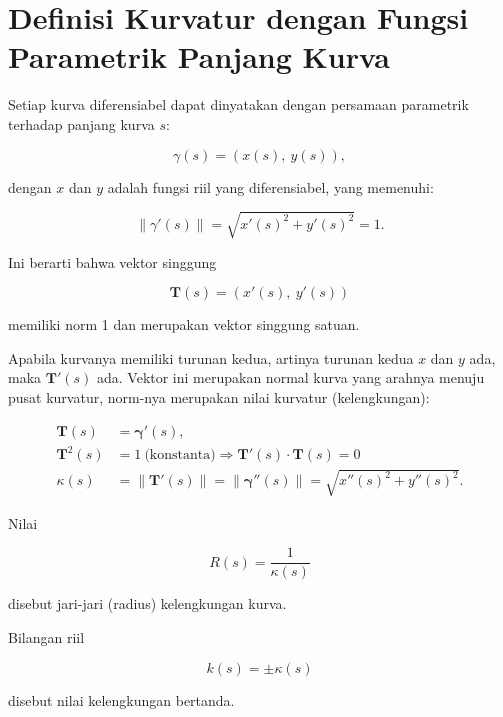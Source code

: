 \documentclass[a4paper,11pt,oneside,enabledeprecatedfontcommands]{scrbook}
\newenvironment{eulernotebook}{}{}
\newcommand{\eulersubheading}[1]{\section{#1}}
\newenvironment{eulercomment}{\par\medskip\noindent}{\par\medskip}
\newenvironment{eulerformula}{}{}
\begin{document}
\begin{eulernotebook}
\eulersubheading{Definisi Kurvatur dengan Fungsi Parametrik Panjang Kurva}
\begin{eulercomment}
Setiap kurva diferensiabel dapat dinyatakan dengan persamaan parametrik terhadap panjang kurva $s$:
\end{eulercomment}
\begin{eulerformula}
\[
\gamma(s) = (x(s),\ y(s)),
\]
\end{eulerformula}
\begin{eulercomment}
dengan $x$ dan $y$ adalah fungsi riil yang diferensiabel, yang memenuhi:
\end{eulercomment}
\begin{eulerformula}
\[
\|\gamma'(s)\|=\sqrt{x'(s)^2+y'(s)^2}=1.
\]
\end{eulerformula}
\begin{eulercomment}
Ini berarti bahwa vektor singgung
\end{eulercomment}
\begin{eulerformula}
\[
\mathbf{T}(s)=(x'(s),\ y'(s))
\]
\end{eulerformula}
\begin{eulercomment}
memiliki norm 1 dan merupakan vektor singgung satuan.

Apabila kurvanya memiliki turunan kedua, artinya turunan kedua $x$ dan $y$ ada, maka $\mathbf{T}'(s)$ ada. Vektor ini merupakan normal kurva yang arahnya menuju pusat kurvatur, norm-nya merupakan nilai kurvatur (kelengkungan):
\end{eulercomment}
\begin{eulerformula}
\[
 \begin{aligned}\mathbf{T}(s) &= \mathbf{\gamma}'(s),\\ \mathbf{T}^{2}(s) &=1\ \text{(konstanta)}\Rightarrow \mathbf{T}'(s)\cdot \mathbf{T}(s)=0\\ \kappa(s) &=\|\mathbf {T}'(s)\|= \|\mathbf{\gamma}''(s)\|=\sqrt{x''(s)^{2}+y''(s)^{2}}.\end{aligned}
\]
\end{eulerformula}
\begin{eulercomment}
Nilai
\end{eulercomment}
\begin{eulerformula}
\[
R(s)=\frac{1}{\kappa(s)}
\]
\end{eulerformula}
\begin{eulercomment}
disebut jari-jari (radius) kelengkungan kurva.

Bilangan riil
\end{eulercomment}
\begin{eulerformula}
\[
 k(s) = \pm\kappa(s)
\]
\end{eulerformula}
\begin{eulercomment}
disebut nilai kelengkungan bertanda.


\end{eulercomment}
\end{eulernotebook}
\end{document}
